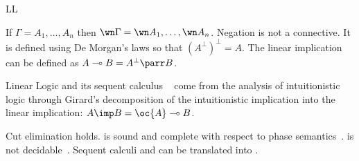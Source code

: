 \begin{entry}{LL}
\begin{clarifications}
If $\Gamma=A_1,\dots,A_n$ then $\wn\Gamma=\wn A_1,\dots,\wn A_n$.
Negation is not a connective. It is defined using De Morgan's laws so that $(A^\bot)^\bot=A$.
The linear implication can be defined as $A\multimap B = A^\bot\parr B$.
\end{clarifications}

\begin{history}
Linear Logic and its sequent calculus \LL~\cite{ll} come from the analysis of intuitionistic logic through Girard's decomposition of the intuitionistic implication into the linear implication: $A\imp B = \oc{A}\multimap B$.
\end{history}

\begin{technicalities}
Cut elimination holds.
\LL{} is sound and complete with respect to phase semantics~\cite{ll}.
\LL{} is not decidable~\cite{Lincoln1992}.
Sequent calculi \LK{} and \LJ{} can be translated into \LL.
\end{technicalities}













\end{entry}



